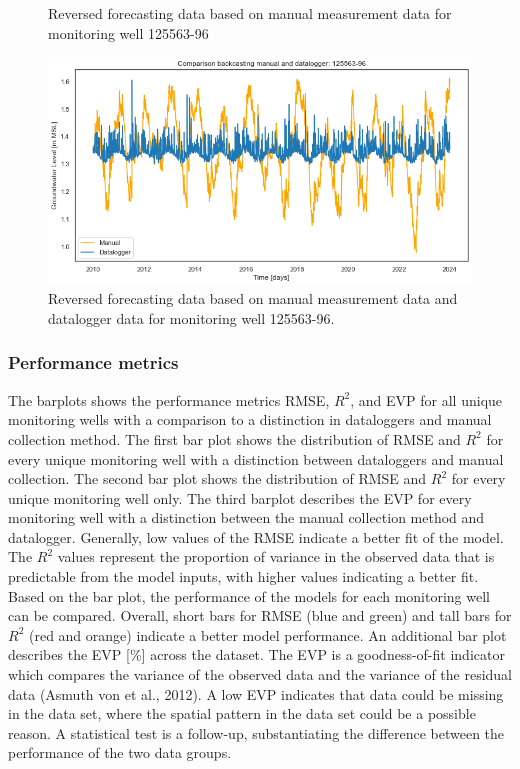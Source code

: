 \begin{figure}
\begin{minipage}{0.32\textwidth}
        \caption{Reversed forecasting data based on manual measurement data for monitoring well 125563-96}
        \label{hpheij}
    \end{minipage}
    \hfill
    \begin{minipage}{0.32\textwidth}
        \centering
        \includegraphics[width=\linewidth]{frontmatter/Heijplaat-fig/pastascombi96.png}
        \caption{Reversed forecasting data based on manual measurement data and datalogger data for monitoring well 125563-96.}
        \label{combiheij}
    \end{minipage}
\end{figure}

\clearpage
\subsubsection{Performance metrics}
The barplots shows the performance metrics RMSE, $R^2$, and EVP for all unique monitoring wells with a comparison to a distinction in dataloggers and manual collection method. The first bar plot shows the distribution of RMSE and $R^2$ for every unique monitoring well with a distinction between dataloggers and manual collection. The second bar plot shows the distribution of RMSE and $R^2$ for every unique monitoring well only. The third barplot  describes the EVP for every monitoring well with a distinction between the manual collection method and datalogger. Generally, low values of the RMSE indicate a better fit of the model. The $R^2$ values represent the proportion of variance in the observed data that is predictable from the model inputs, with higher values indicating a better fit. Based on the bar plot, the performance of the models for each monitoring well can be compared. Overall, short bars for RMSE (blue and green) and tall bars for $R^2$ (red and orange) indicate a better model performance. An additional bar plot describes the EVP [\%] across the dataset. The EVP is a goodness-of-fit indicator which compares the variance of the observed data and the variance of the residual data (Asmuth von et al., 2012). A low EVP indicates that data could be missing in the data set, where the spatial pattern in the data set could be a possible reason. A statistical test is a follow-up, substantiating the difference between the performance of the two data groups.


